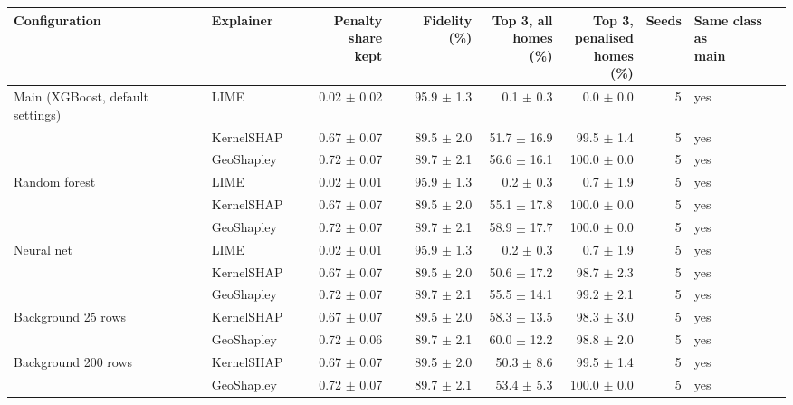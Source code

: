\begin{table}[t]
\centering
\footnotesize
\setlength{\tabcolsep}{3.5pt}
\begin{adjustbox}{max width=\linewidth}
\begin{tabular}{llrrrrrl}
\toprule
Configuration & Explainer & \makecell[b]{Penalty share \\ kept} & Fidelity (\%) & \makecell[b]{Top 3, all \\ homes (\%)} & \makecell[b]{Top 3, \\ penalised \\ homes (\%)} & Seeds & \makecell[b]{Same class as \\ main} \\
\midrule
Main (XGBoost, default settings) & LIME & 0.02 $\pm$ 0.02 & 95.9 $\pm$ 1.3 & 0.1 $\pm$ 0.3 & 0.0 $\pm$ 0.0 & 5 & yes \\
 & KernelSHAP & 0.67 $\pm$ 0.07 & 89.5 $\pm$ 2.0 & 51.7 $\pm$ 16.9 & 99.5 $\pm$ 1.4 & 5 & yes \\
 & GeoShapley & 0.72 $\pm$ 0.07 & 89.7 $\pm$ 2.1 & 56.6 $\pm$ 16.1 & 100.0 $\pm$ 0.0 & 5 & yes \\
\midrule
Random forest & LIME & 0.02 $\pm$ 0.01 & 95.9 $\pm$ 1.3 & 0.2 $\pm$ 0.3 & 0.7 $\pm$ 1.9 & 5 & yes \\
 & KernelSHAP & 0.67 $\pm$ 0.07 & 89.5 $\pm$ 2.0 & 55.1 $\pm$ 17.8 & 100.0 $\pm$ 0.0 & 5 & yes \\
 & GeoShapley & 0.72 $\pm$ 0.07 & 89.7 $\pm$ 2.1 & 58.9 $\pm$ 17.7 & 100.0 $\pm$ 0.0 & 5 & yes \\
\midrule
Neural net & LIME & 0.02 $\pm$ 0.01 & 95.9 $\pm$ 1.3 & 0.2 $\pm$ 0.3 & 0.7 $\pm$ 1.9 & 5 & yes \\
 & KernelSHAP & 0.67 $\pm$ 0.07 & 89.5 $\pm$ 2.0 & 50.6 $\pm$ 17.2 & 98.7 $\pm$ 2.3 & 5 & yes \\
 & GeoShapley & 0.72 $\pm$ 0.07 & 89.7 $\pm$ 2.1 & 55.5 $\pm$ 14.1 & 99.2 $\pm$ 2.1 & 5 & yes \\
\midrule
Background 25 rows & KernelSHAP & 0.67 $\pm$ 0.07 & 89.5 $\pm$ 2.0 & 58.3 $\pm$ 13.5 & 98.3 $\pm$ 3.0 & 5 & yes \\
 & GeoShapley & 0.72 $\pm$ 0.06 & 89.7 $\pm$ 2.1 & 60.0 $\pm$ 12.2 & 98.8 $\pm$ 2.0 & 5 & yes \\
\midrule
Background 200 rows & KernelSHAP & 0.67 $\pm$ 0.07 & 89.5 $\pm$ 2.0 & 50.3 $\pm$ 8.6 & 99.5 $\pm$ 1.4 & 5 & yes \\
 & GeoShapley & 0.72 $\pm$ 0.07 & 89.7 $\pm$ 2.1 & 53.4 $\pm$ 5.3 & 100.0 $\pm$ 0.0 & 5 & yes \\

\end{tabular}
\end{adjustbox}
\end{table}
